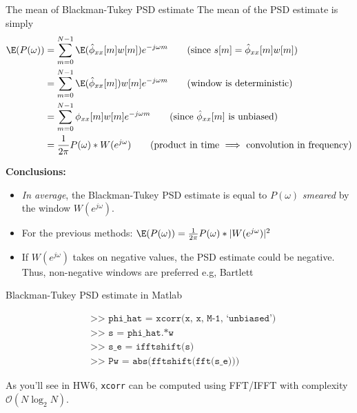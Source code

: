 \documentclass[10pt, aspectratio=169, handout]{beamer}
\begin{document}
%
\begin{frame}{The mean of Blackman-Tukey PSD estimate}
The mean of the PSD estimate is simply
\begin{align*}
	\E(P(\omega)) &= \sum_{m = 0}^{N-1}\E(\hat{\phi}_{xx}[m]w[m])e^{-j\omega m} \tag{since $s[m] = \hat{\phi}_{xx}[m]w[m]$} \\
	& = \sum_{m = 0}^{N-1}\E(\hat{\phi}_{xx}[m])w[m]e^{-j\omega m} \tag{window is deterministic}\\
	& = \sum_{m = 0}^{N-1}\phi_{xx}[m]w[m]e^{-j\omega m} \tag{since $\hat{\phi}_{xx}[m]$ is unbiased} \\
	&= \frac{1}{2\pi}P(\omega)\ast W(e^{j\omega}) \tag{product in time $\implies$ convolution in frequency}
\end{align*}

\textbf{Conclusions:} 
\begin{itemize} 
	\item\textit{In average}, the Blackman-Tukey PSD estimate is equal to $P(\omega)$ \textit{smeared} by the window $W(e^{j\omega})$.
	\item For the previous methods: $\E(P(\omega)) = \frac{1}{2\pi}P(\omega)\ast |W(e^{j\omega})|^2$
	\item If $W(e^{j\omega})$ takes on negative values, the PSD estimate could be negative. Thus, non-negative windows are preferred e.g, Bartlett
\end{itemize} 
\end{frame}

%
\begin{frame}{Blackman-Tukey PSD estimate in Matlab}

\begin{align*}
& \texttt{>> phi\_hat = xcorr(x, x, M-1, `unbiased')} \tag{unbiased autocorrelation estimate}\\
& \texttt{>> s = phi\_hat.*w} \tag{windowing} \\
& \texttt{>> s\_e = ifftshift(s)} \tag{form DFT-even sequence} \\
& \texttt{>> Pw = abs(fftshift(fft(s\_e)))} \tag{two-sided PSD in interval $[-\pi, \pi)$}
\end{align*}

As you'll see in HW6, \texttt{xcorr} can be computed using FFT/IFFT with complexity $\mathcal{O}(N\log_2N)$.

\end{frame}
\end{document}
